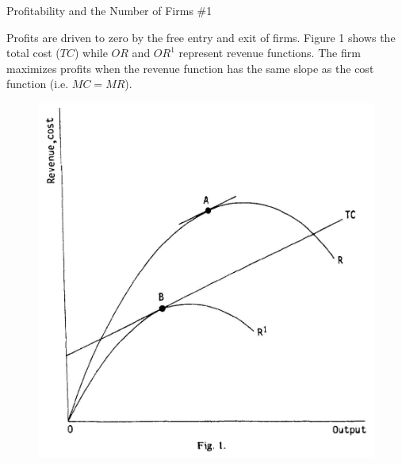\documentclass[aspectratio=169]{beamer}
\begin{document}
\begin{frame}{Profitability and the Number of Firms \#1}

Profits are driven to zero by the free entry and exit of firms.  Figure 1 shows the total cost ($ TC $) while $ OR $ and $ OR^{1} $ represent revenue functions.  The firm maximizes profits when the revenue function has the same slope as the cost function (i.e. $ MC = MR $).
\begin{figure}
     \centering
     \includegraphics[scale=0.45]{KrugmanFig1.jpg}
     \label{fig:figure1}
\end{figure}
    
\end{frame}

\end{document}
